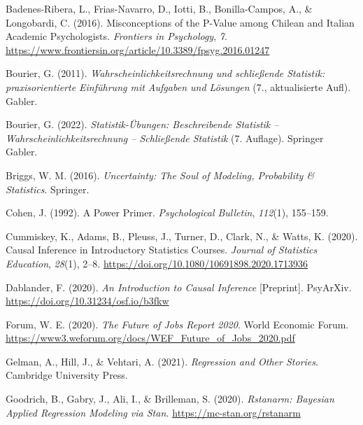 \documentclass[
  ngerman,
  letterpaper,
  twoside,
  open=any]{scrbook}
\newlength{\cslhangindent}
\newenvironment{CSLReferences}[2] %
 {\begin{list}{}{%
  \setlength{\itemindent}{0pt}
  \setlength{\leftmargin}{0pt}
  \setlength{\parsep}{0pt}
  \ifodd #1
   \setlength{\leftmargin}{\cslhangindent}
   \setlength{\itemindent}{-1\cslhangindent}
  \fi
  \setlength{\itemsep}{#2\baselineskip}}}
 {\end{list}}
\theoremstyle{definition}
\theoremstyle{plain}
\theoremstyle{definition}
\theoremstyle{definition}
\theoremstyle{definition}
\theoremstyle{definition}
\theoremstyle{remark}
\begin{document}

\protect{}\label{refs}
\begin{CSLReferences}{1}{0}
Badenes-Ribera, L., Frias-Navarro, D., Iotti, B., Bonilla-Campos, A., \&
Longobardi, C. (2016). Misconceptions of the P-Value among {Chilean} and
{Italian Academic Psychologists}. \emph{Frontiers in Psychology},
\emph{7}.
\url{https://www.frontiersin.org/article/10.3389/fpsyg.2016.01247}

Bourier, G. (2011). \emph{Wahrscheinlichkeitsrechnung und schließende
Statistik: praxisorientierte Einführung mit Aufgaben und Lösungen} (7.,
aktualisierte Aufl). Gabler.

Bourier, G. (2022). \emph{Statistik-Übungen: {Beschreibende} Statistik
-- Wahrscheinlichkeitsrechnung -- Schließende Statistik} (7. Auflage).
Springer Gabler.

Briggs, W. M. (2016). \emph{Uncertainty: {The Soul} of {Modeling},
{Probability} \& {Statistics}}. Springer.

Cohen, J. (1992). A Power Primer. \emph{Psychological Bulletin},
\emph{112}(1), 155--159.

Cummiskey, K., Adams, B., Pleuss, J., Turner, D., Clark, N., \& Watts,
K. (2020). Causal {Inference} in {Introductory Statistics Courses}.
\emph{Journal of Statistics Education}, \emph{28}(1), 2--8.
\url{https://doi.org/10.1080/10691898.2020.1713936}

Dablander, F. (2020). \emph{An {Introduction} to {Causal Inference}}
{[}Preprint{]}. PsyArXiv. \url{https://doi.org/10.31234/osf.io/b3fkw}

Forum, W. E. (2020). \emph{The {Future} of {Jobs Report} 2020}. World
Economic Forum.
\url{https://www3.weforum.org/docs/WEF_Future_of_Jobs_2020.pdf}

Gelman, A., Hill, J., \& Vehtari, A. (2021). \emph{Regression and Other
Stories}. Cambridge University Press.

Goodrich, B., Gabry, J., Ali, I., \& Brilleman, S. (2020).
\emph{Rstanarm: {Bayesian} Applied Regression Modeling via {Stan}.}
\url{https://mc-stan.org/rstanarm}


\end{CSLReferences}
\end{document}
